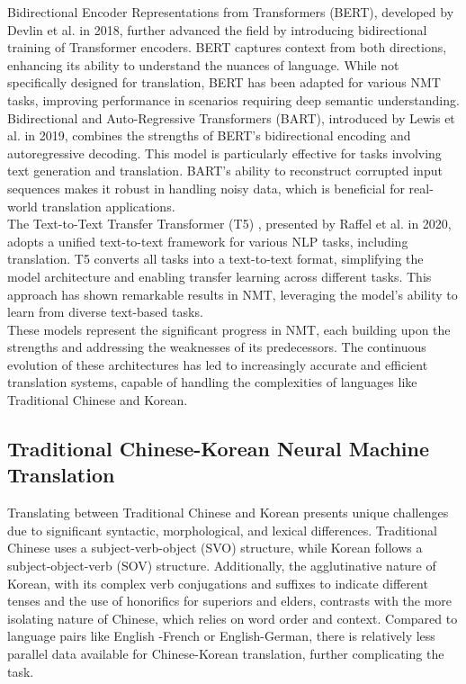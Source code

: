 \documentclass[PhD]{PHlab-thesis}
\begin{document}
	Bidirectional Encoder Representations from Transformers (BERT)\cite{devlin2018bert}, developed by Devlin et al. in 2018, further advanced the field by introducing bidirectional training of Transformer encoders. BERT captures context from both directions, enhancing its ability to understand the nuances of language. While not specifically designed for translation, BERT has been adapted for various NMT tasks, improving performance in scenarios requiring deep semantic understanding.\\
	Bidirectional and Auto-Regressive Transformers (BART)\cite{lewis2019bart}, introduced by Lewis et al. in 2019, combines the strengths of BERT's bidirectional encoding and autoregressive decoding. This model is particularly effective for tasks involving text generation and translation. BART's ability to reconstruct corrupted input sequences makes it robust in handling noisy data, which is beneficial for real-world translation applications.\\
	The Text-to-Text Transfer Transformer (T5)\cite{raffel2020exploring} , presented by Raffel et al. in 2020, adopts a unified text-to-text framework for various NLP tasks, including translation. T5 converts all tasks into a text-to-text format, simplifying the model architecture and enabling transfer learning across different tasks. This approach has shown remarkable results in NMT, leveraging the model's ability to learn from diverse text-based tasks.\\
	These models represent the significant progress in NMT, each building upon the strengths and addressing the weaknesses of its predecessors. The continuous evolution of these architectures has led to increasingly accurate and efficient translation systems, capable of handling the complexities of languages like Traditional Chinese and Korean.\\

\subsection{Traditional Chinese-Korean Neural Machine Translation}
Translating between Traditional Chinese and Korean presents unique challenges due to significant syntactic, morphological, and lexical differences. Traditional Chinese uses a subject-verb-object (SVO) structure, while Korean follows a subject-object-verb (SOV) structure. Additionally, the agglutinative nature of Korean, with its complex verb conjugations and suffixes to indicate different tenses and the use of honorifics for superiors and elders, contrasts with the more isolating nature of Chinese, which relies on word order and context. Compared to language pairs like English -French or English-German, there is relatively less parallel data available for Chinese-Korean translation, further complicating the task.\\
\end{document}
